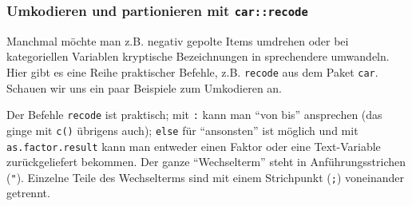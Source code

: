 \documentclass[12pt,ngerman,]{book}
\makeatletter
\newenvironment{Shaded}{\begin{snugshade}}{\end{snugshade}}
\newcommand{\KeywordTok}[1]{\textcolor[rgb]{0.13,0.29,0.53}{\textbf{{#1}}}}
\newcommand{\DataTypeTok}[1]{\textcolor[rgb]{0.13,0.29,0.53}{{#1}}}
\newcommand{\StringTok}[1]{\textcolor[rgb]{0.31,0.60,0.02}{{#1}}}
\newcommand{\CommentTok}[1]{\textcolor[rgb]{0.56,0.35,0.01}{\textit{{#1}}}}
\newcommand{\OtherTok}[1]{\textcolor[rgb]{0.56,0.35,0.01}{{#1}}}
\newcommand{\NormalTok}[1]{{#1}}
\newenvironment{kframe}{%
\medskip{}
\setlength{\fboxsep}{.8em}
 \def\at@end@of@kframe{}%
 \ifinner\ifhmode%
  \def\at@end@of@kframe{\end{minipage}}%
  \begin{minipage}{\columnwidth}%
 \fi\fi%
 \def\FrameCommand##1{\hskip\@totalleftmargin \hskip-\fboxsep
 \colorbox{shadecolor}{##1}\hskip-\fboxsep
     \hskip-\linewidth \hskip-\@totalleftmargin \hskip\columnwidth}%
 \MakeFramed {\advance\hsize-\width
   \@totalleftmargin\z@ \linewidth\hsize
   \@setminipage}}%
 {\par\unskip\endMakeFramed%
 \at@end@of@kframe}
\renewenvironment{Shaded}{\begin{kframe}}{\end{kframe}}
\theoremstyle{definition}
\theoremstyle{definition}
\theoremstyle{remark}
\makeatother
\begin{document}
\subsubsection{\texorpdfstring{Umkodieren und partionieren mit
\texttt{car::recode}}{Umkodieren und partionieren mit car::recode}}\label{umkodieren-und-partionieren-mit-carrecode}

Manchmal möchte man z.B. negativ gepolte Items umdrehen oder bei
kategoriellen Variablen kryptische Bezeichnungen in sprechendere
umwandeln. Hier gibt es eine Reihe praktischer Befehle, z.B.
\texttt{recode} aus dem Paket \texttt{car}. Schauen wir uns ein paar
Beispiele zum Umkodieren an.

\begin{Shaded}
\end{Shaded}

Der Befehle \texttt{recode} ist praktisch; mit \texttt{:} kann man ``von
bis'' ansprechen (das ginge mit \texttt{c()} übrigens auch);
\texttt{else} für ``ansonsten'' ist möglich und mit
\texttt{as.factor.result} kann man entweder einen Faktor oder eine
Text-Variable zurückgeliefert bekommen. Der ganze ``Wechselterm'' steht
in Anführungsstrichen (\texttt{"}). Einzelne Teile des Wechselterms sind
mit einem Strichpunkt (\texttt{;}) voneinander getrennt.
\end{document}

